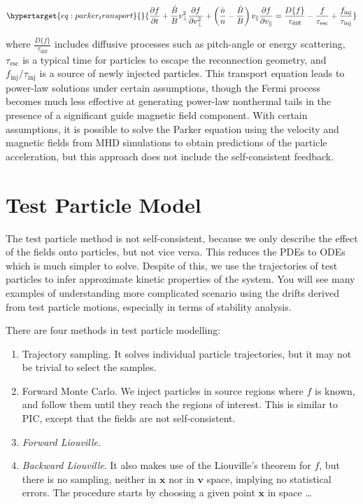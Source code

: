 \documentclass[
  notoc %
]{tufte-book}
\begin{document}
\begin{equation}\protect\hypertarget{eq:parker_transport}{}{
\frac{\partial f}{\partial t} + \frac{\dot{B}}{B}v_\perp^2\frac{\partial f}{\partial v_\perp^2} + \left( \frac{\dot{n}}{n} - \frac{\dot{B}}{B} \right)v_\parallel\frac{\partial f}{\partial v_\parallel} = \frac{D\{ f \}}{\tau_\text{diff}} - \frac{f}{\tau_\text{esc}} + \frac{f_\text{inj}}{\tau_\text{inj}}
}\label{eq:parker_transport}\end{equation}

where \(\frac{D\{ f \}}{\tau_\text{diff}}\) includes diffusive processes
such as pitch-angle or energy scattering, \(\tau_\text{esc}\) is a
typical time for particles to escape the reconnection geometry, and
\(f_\text{inj}/\tau_\text{inj}\) is a source of newly injected
particles. This transport equation leads to power-law solutions under
certain assumptions, though the Fermi process becomes much less
effective at generating power-law nonthermal tails in the presence of a
significant guide magnetic field component. With certain assumptions, it
is possible to solve the Parker equation using the velocity and magnetic
fields from MHD simulations to obtain predictions of the particle
acceleration, but this approach does not include the self-consistent
feedback.

\hypertarget{test-particle-model}{%
\section{Test Particle Model}\label{test-particle-model}}

The test particle method is not self-consistent, because we only
describe the effect of the fields onto particles, but not vice versa.
This reduces the PDEs to ODEs which is much simpler to solve. Despite of
this, we use the trajectories of test particles to infer approximate
kinetic properties of the system. You will see many examples of
understanding more complicated scenario using the drifts derived from
test particle motions, especially in terms of stability analysis.

There are four methods in test particle modelling:

\begin{enumerate}
\def\labelenumi{\arabic{enumi}.}
\item
  Trajectory sampling. It solves individual particle trajectories, but
  it may not be trivial to select the samples.
\item
  Forward Monte Carlo. We inject particles in source regions where \(f\)
  is known, and follow them until they reach the regions of interest.
  This is similar to PIC, except that the fields are not
  self-consistent.
\item
  \emph{Forward Liouville}.
\item
  \emph{Backward Liouville}. It also makes use of the Liouville's
  theorem for \(f\), but there is no sampling, neither in \(\mathbf{x}\)
  nor in \(\mathbf{v}\) space, implying no statistical errors. The
  procedure starts by choosing a given point \(\mathbf{x}\) in space
  \ldots{}
\end{enumerate}
\end{document}
